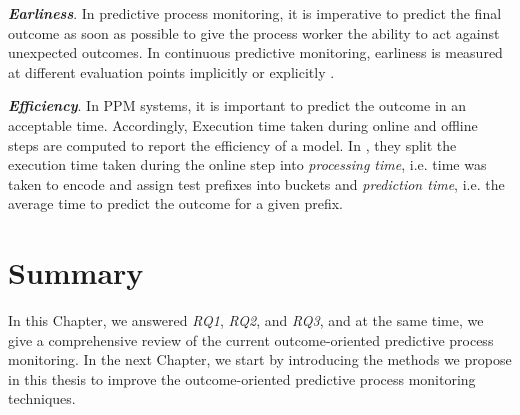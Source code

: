 \textbf{\textit{Earliness}}. In predictive process monitoring, it is imperative to predict the final outcome as soon as possible to give the process worker the ability to act against unexpected outcomes. In continuous predictive monitoring, earliness is measured at different evaluation points implicitly or explicitly \cite{leontjeva2016complex}. 


\textbf{\textit{Efficiency}}. In PPM systems, it is important to predict the outcome in an acceptable time. Accordingly, Execution time taken during online and offline steps are computed to report the efficiency of a model. In \cite{di2017clustering}, they split the execution time taken during the online step into \textit{processing time}, i.e. time was taken to encode and assign test prefixes into buckets and \textit{prediction time}, i.e. the average time to predict the outcome for a given prefix.  


\section{Summary} \label{s3}
In this Chapter, we answered \textit{RQ1}, \textit{RQ2}, and \textit{RQ3}, and at the same time, we give a comprehensive review of the current outcome-oriented predictive process monitoring. In the next Chapter, we start by introducing the methods we propose in this thesis to improve the outcome-oriented predictive process monitoring techniques. 






